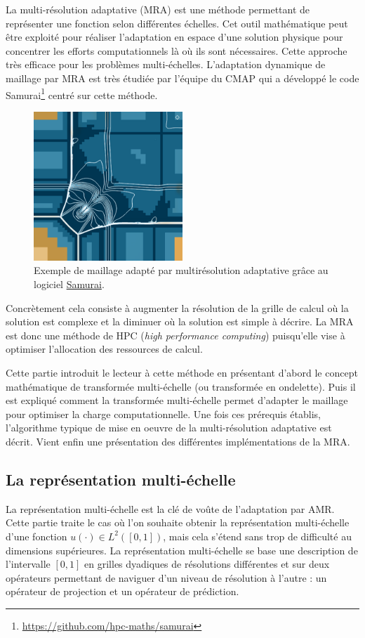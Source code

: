 La multi-résolution adaptative (MRA) est une méthode permettant de représenter une fonction selon différentes échelles.
Cet outil mathématique peut être exploité pour réaliser l'adaptation en espace d'une solution physique pour concentrer les efforts computationnels là où ils sont nécessaires. 
Cette approche très efficace pour les problèmes multi-échelles.
L'adaptation dynamique de maillage par MRA est très étudiée par l'équipe du CMAP qui a développé le code Samurai\footnote{\href{https://github.com/hpc-maths/samurai}{https://github.com/hpc-maths/samurai}}
centré sur cette méthode.
\begin{figure}[h]
    \centering
    \includegraphics[width=0.5\textwidth]{media/3_/3_/exemple_compression_samurai.png}
    \caption{Exemple de maillage adapté par multirésolution adaptative grâce au logiciel \href{https://github.com/hpc-maths/samurai}{Samurai}.}
    \label{fig:samurai}
\end{figure}
Concrètement cela consiste à augmenter la résolution de la grille de calcul où la solution est complexe et la diminuer où la solution est simple à décrire.
La MRA est donc une méthode de HPC (\textit{high performance computing}) puisqu'elle vise à optimiser l'allocation des ressources de calcul.\par
Cette partie introduit le lecteur à cette méthode en présentant d'abord le concept mathématique de transformée multi-échelle (ou transformée en ondelette). 
Puis il est expliqué comment la transformée multi-échelle permet d'adapter le maillage pour optimiser la charge computationnelle.
Une fois ces prérequis établis, l'algorithme typique de mise en oeuvre de la multi-résolution adaptative est décrit.
Vient enfin une présentation des différentes implémentations de la MRA.

\subsection{La représentation multi-échelle}
    La représentation multi-échelle est la clé de voûte de l'adaptation par AMR.
    Cette partie traite le cas où l'on souhaite obtenir la représentation multi-échelle d'une fonction $u(\cdot) \in L^2([0,1])$, 
    mais cela s'étend sans trop de difficulté au dimensions supérieures.
    La représentation multi-échelle se base une description de l'intervalle $[0,1]$ en grilles dyadiques de résolutions différentes
    et sur deux opérateurs permettant de naviguer d'un niveau de résolution à l'autre : un opérateur de projection et un opérateur de prédiction.
